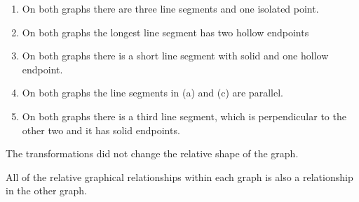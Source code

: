 \documentclass{ximera}
\begin{document}
\begin{image}
\end{image}




\begin{enumerate}
\item On both graphs there are three line segments and one isolated point.
\item On both graphs the longest line segment has two hollow endpoints
\item On both graphs there is a short line segment with solid and one hollow endpoint. 
\item On both graphs the line segments in (a) and (c) are parallel.
\item On both graphs there is a third line segment, which is perpendicular to the other two and it has solid endpoints.
\end{enumerate}




The transformations did not change the relative shape of the graph.



All of the relative graphical relationships within each graph is also a relationship in the other graph. \\
\end{document}
